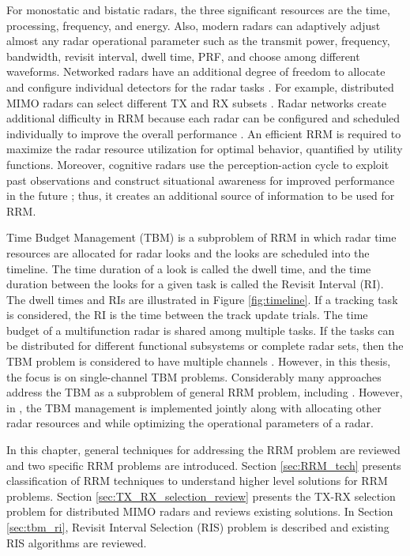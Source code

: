 \documentclass[english, 12pt, a4paper, elec, utf8, a-1b, online]{aaltothesis}
\numberwithin{equation}{section}
\begin{document}
For monostatic and bistatic radars, the three significant resources are the time, processing, frequency, and energy. 
Also, modern radars can adaptively adjust almost any radar operational parameter such as the transmit power, frequency, bandwidth, revisit interval, dwell time, PRF, and choose among different waveforms.
Networked radars have an additional degree of freedom to allocate and configure individual detectors for the radar tasks \cite{Moo2016}. 
For example, distributed MIMO radars can select different TX and RX subsets \cite{Godrich2011a, Godrich2011, Sun2014}.
Radar networks create additional difficulty in RRM because each radar can be configured and scheduled individually to improve the overall performance \cite{Sun2014}.
An efficient RRM is required to maximize the radar resource utilization for optimal behavior, quantified by utility functions. 
Moreover, cognitive radars use the perception-action cycle to exploit past observations and construct situational awareness for improved performance in the future \cite{Haykin2006}; thus, it creates an additional source of information to be used for RRM.

Time Budget Management (TBM) is a subproblem of RRM in which radar time resources are allocated for radar looks and the looks are scheduled into the timeline. 
The time duration of a look is called the dwell time, and the time duration between the looks for a given task is called the Revisit Interval (RI). 
The dwell times and RIs are illustrated in Figure \ref{fig:timeline}. 
If a tracking task is considered, the RI is the time between the track update trials. 
The time budget of a multifunction radar is shared among multiple tasks.
If the tasks can be distributed for different functional subsystems or complete radar sets, then the TBM problem is considered to have multiple channels \cite{Shaghaghi2018}.
However, in this thesis, the focus is on single-channel TBM problems.
Considerably many approaches address the TBM as a subproblem of general RRM problem, including \cite{Koch1999, Wintenby2006, Byrne2016, Xu2010}. 
However, in \cite{Rajkumar1997, Irci2010, Charlish2015a}, the TBM management is implemented jointly along with allocating other radar resources and while optimizing the operational parameters of a radar.


In this chapter, general techniques for addressing the RRM problem are reviewed and two specific RRM problems are introduced.
Section \ref{sec:RRM_tech} presents classification of RRM techniques to understand higher level solutions for RRM problems.
Section \ref{sec:TX_RX_selection_review} presents the TX-RX selection problem for distributed MIMO radars and reviews existing solutions. 
In Section \ref{sec:tbm_ri}, Revisit Interval Selection (RIS) problem is described and existing RIS algorithms are reviewed.
\end{document}
